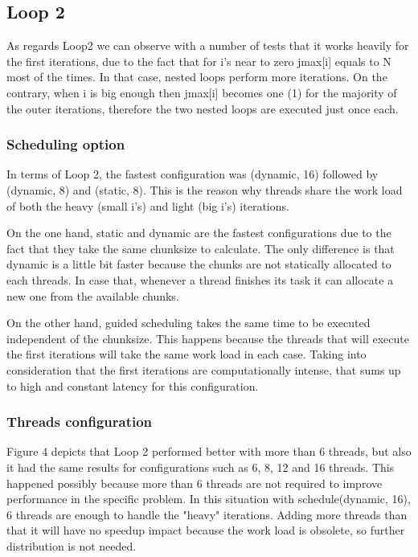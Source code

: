 \subsection{Loop 2}

As regards Loop2 we can observe with a number of tests that it works heavily for the first iterations, due to the fact that for i's near to zero jmax[i] equals to N most of the times. In that case, nested loops perform more iterations. On the contrary, when i is big enough then jmax[i] becomes one (1) for the majority of the outer iterations, therefore the two nested loops are executed just once each.

\subsubsection{Scheduling option}
In terms of Loop 2, the fastest configuration was (dynamic, 16) followed by (dynamic, 8) and (static, 8). This is the reason why threads share the work load of both the heavy (small i's) and light (big i's) iterations.

On the one hand, static and dynamic are the fastest configurations due to the fact that they take the same chunksize to calculate. The only difference is that dynamic is a little bit faster because the chunks are not statically allocated to each threads. In case that, whenever a thread finishes its task it can allocate a new one from the available chunks.

On the other hand, guided scheduling takes the same time to be executed independent of the chunksize. This happens because the threads that will execute the first iterations will take the same work load in each case. Taking into consideration that the first iterations are computationally intense, that sums up to high and constant latency for this configuration.

\subsubsection{Threads configuration}
Figure 4 depicts that Loop 2 performed better with more than 6 threads, but also it had the same results for configurations such as 6, 8, 12 and 16 threads. This happened possibly because more than 6 threads are not required to improve performance in the specific problem. In this situation with schedule(dynamic, 16), 6 threads are enough to handle the "heavy" iterations. Adding more threads than that it will have no speedup impact because the work load is obsolete, so further distribution is not needed.